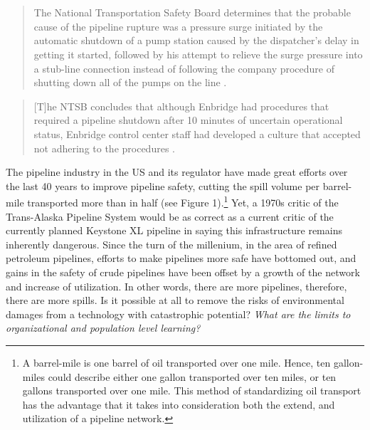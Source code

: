 \section{}

\begin{quote}
	The National Transportation Safety Board determines that the probable cause of the pipeline rupture was a pressure surge initiated by the automatic shutdown of a pump station caused by the dispatcher's delay in getting it started, followed by his attempt to relieve the surge pressure into a stub-line connection instead of following the company procedure of shutting down all of the pumps on the line \citep{NTSB1981}.
\end{quote}

\begin{quote}
	[T]he NTSB concludes that although Enbridge had procedures that required a pipeline shutdown after 10 minutes of uncertain operational status, Enbridge control center staff had developed a culture that accepted not adhering to the procedures \citep{NTSB2012}.
\end{quote}

The pipeline industry in the US and its regulator have made great efforts over the last 40 years to improve pipeline safety, cutting the spill volume per barrel-mile transported more than in half (see Figure 1).\footnote{A barrel-mile is one barrel of oil transported over one mile. Hence, ten gallon-miles could describe either one gallon transported over ten miles, or ten gallons transported over one mile. This method of standardizing oil transport has the advantage that it takes into consideration both the extend, and utilization of a pipeline network.} Yet, a 1970s critic of the Trans-Alaska Pipeline System would be as correct as a current critic of the currently planned Keystone XL pipeline in saying this infrastructure remains inherently dangerous. Since the turn of the millenium, in the area of refined petroleum pipelines, efforts to make pipelines more safe have bottomed out, and gains in the safety of crude pipelines have been offset by a growth of the network and increase of utilization. In other words, there are more pipelines, therefore, there are more spills. Is it possible at all to remove the risks of environmental damages from a technology with catastrophic potential? \textit{What are the limits to organizational and population level learning?}

